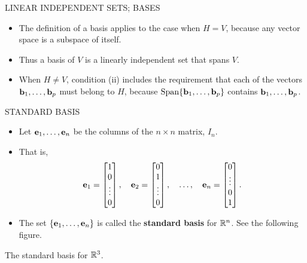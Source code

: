 \begin{frame}{LINEAR INDEPENDENT SETS; BASES}
\begin{itemize}
\item The definition of a basis applies to the case when $H=V$, because any vector space is a subspace of itself.
\item Thus a basis of $V$ is a linearly independent set that spans $V$.
\item When $H\ne V$, condition (ii) includes the requirement that each of the vectors $\mathbf{b}_1,\ldots,\mathbf{b}_p$ must belong to $H$, because $\operatorname{Span}\{\mathbf{b}_1,\ldots,\mathbf{b}_p\}$ contains $\mathbf{b}_1,\ldots,\mathbf{b}_p$.
\end{itemize}
\end{frame}

\begin{frame}[shrink=13]{STANDARD BASIS}
\begin{itemize}
\item Let $\mathbf{e}_1,\ldots,\mathbf{e}_n$ be the columns of the $n\times n$ matrix, $I_n$.
\item That is,
\[
\mathbf{e}_1=\begin{bmatrix}1\\0\\\vdots\\0\end{bmatrix},
\quad
\mathbf{e}_2=\begin{bmatrix}0\\1\\\vdots\\0\end{bmatrix},
\quad\ldots,\quad
\mathbf{e}_n=\begin{bmatrix}0\\\vdots\\0\\1\end{bmatrix}.
\]
\item The set $\{\mathbf{e}_1,\ldots,\mathbf{e}_n\}$ is called the \textbf{standard basis} for $\mathbb{R}^n$. See the following figure.
\end{itemize}
\begin{center}

The standard basis for $\mathbb{R}^3$.
\end{center}
\end{frame}

